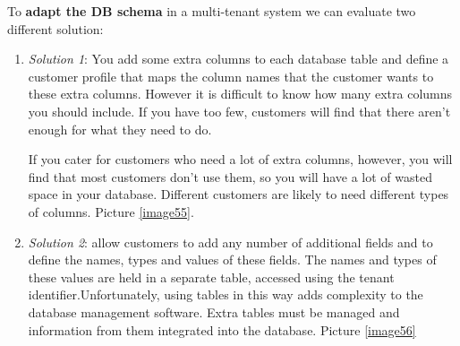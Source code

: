 \documentclass[10pt,a4paper]{report}
\begin{document}
To \textbf{adapt the DB schema} in a multi-tenant system we can evaluate two different solution:
\begin{enumerate}
	\item \textit{Solution 1}: You add some extra columns to each database table and define a
	customer profile that maps the column names that the customer wants to
	these extra columns. However it is difficult to know how many extra columns you should include. If you have too few, customers will find that there aren’t enough for what they need to do.
	
	If you cater for customers who need a lot of extra columns, however, you will find
	that most customers don’t use them, so you will have a lot of wasted space in your
	database. Different customers are likely to need different types of columns. Picture \ref{image55}.
	
	
	\item \textit{Solution 2}:  allow customers to
	add any number of additional fields and to define the names, types and
	values of these fields. The names and types of these values are held in a separate table,
	accessed using the tenant identifier.Unfortunately, using tables in this way adds complexity to the database
	management software.
	Extra tables must be managed and information from them integrated into the
	database.  Picture \ref{image56}
	
	
\end{enumerate}
\end{document}
